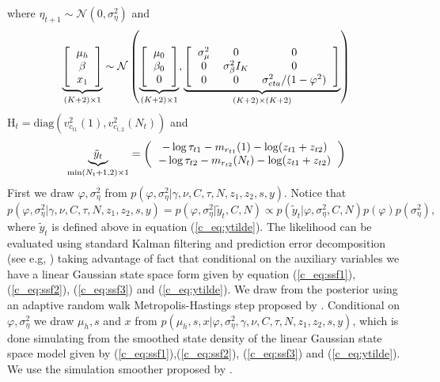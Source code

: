 \documentclass[12pt]{article}
\begin{document}
where $\eta_{t+1} \sim \mathcal{N}(0,\sigma^{2}_{\eta})$ and 
\begin{equation}
\underbrace{\left[ 
\begin{tabular}{c}
$\mu_{h}$ \\
$\beta$ \\
$x_{1}$  
\end{tabular}
\right]}_{(K+2)\times 1} \sim \mathcal{N} \left( \underbrace{\left[ 
\begin{tabular}{c}
$\mu_{0}$ \\
$\beta_{0}$ \\
0
\end{tabular}
\right]}_{(K+2)\times 1} ,\underbrace{\left[ 
\begin{tabular}{ccc}
$\sigma^{2}_{\mu}$ & 0& 0 \\
0&$\sigma^{2}_{\beta} I_{K}$ &  0 \\
0& 0& $\sigma^{2}_{eta}/(1-\varphi^2)$
\end{tabular}
\right]}_{(K+2)\times (K+2)}  \right)  
 \label{c_eq:ssf3}
\end{equation}
$ \text{H}_t = \text{diag}( v^{2}_{c_{t1}}(1), v^{2}_{c_{t,2}}(N_t))$ and 
\begin{eqnarray}
\underbrace{\tilde{y}_t}_{\min(N_t+1,2)\times 1} = \left(
\begin{tabular}{c}
$- \log \tau_{t1}- m_{ r_{t1}}(1)-\log(z_{t1}+z_{t2})$ \\
$- \log \tau_{t2}- m_{ r_{t2}}(N_t)-\log(z_{t1}+z_{t2})$ 
\end{tabular} \right)
\label{c_eq:ytilde}
\end{eqnarray}
First we draw $\varphi, \sigma^{2}_{\eta}$ from $p(\varphi,\sigma^{2}_{\eta}  | \gamma, \nu, C , \tau, N,z_1 , z_2,s ,y)$. Notice that 
\begin{equation}
p(\varphi,\sigma^{2}_{\eta} | \gamma, \nu, C , \tau, N,z_1 , z_2,s ,y)=p(\varphi,\sigma^{2}_{\eta} | \tilde{y}_t, C, N) \propto p(\tilde{y}_t | \varphi,\sigma^{2}_{\eta},C, N) p( \varphi)p(\sigma^{2}_{\eta}),
\end{equation}
where $\tilde{y}_t$ is defined above in equation (\ref{c_eq:ytilde}). The likelihood can be evaluated using standard Kalman filtering and prediction error decomposition (see e.g, \citet{DurbinKoopman2012}) taking advantage of fact that conditional on the auxiliary variables we have a linear Gaussian state space form given by equation (\ref{c_eq:ssf1}),(\ref{c_eq:ssf2}), (\ref{c_eq:ssf3}) and (\ref{c_eq:ytilde}). We draw from the posterior using an adaptive random walk Metropolis-Hastings step proposed by \citet{RobertsRosenthal2009}. 
Conditional on  $\varphi,\sigma^{2}_{\eta} $ we draw $\mu_{h},s$ and $x$ from $p(\mu_{h},s ,x| \varphi,\sigma^{2}_{\eta} ,\gamma, \nu, C, \tau, N,z_1 , z_2,s ,y)$, which is done simulating from the smoothed state density of the linear Gaussian state space model  given by  (\ref{c_eq:ssf1}),(\ref{c_eq:ssf2}), (\ref{c_eq:ssf3}) and (\ref{c_eq:ytilde}). We use the simulation smoother proposed by \citet{DurbinKoopman2002}.
\end{document}
